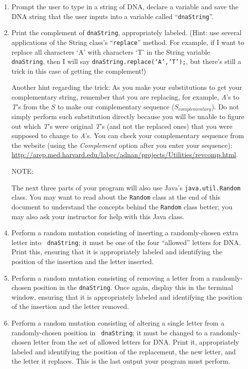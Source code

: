 \begin{enumerate}

\item Prompt the user to type in a string of DNA, declare a variable and save the DNA string that the user inputs into a
  variable called ``{\tt dnaString}''.

\item Print the complement of {\tt dnaString}, appropriately labeled.  (Hint: use several applications of the String
  class's ``{\tt replace}'' method. For example, if I want to replace all characters `A' with characters `T' in the
  String variable {\tt dnaString}, then I will say {\tt dnaString.replace(`A',`T');}, but there's still a trick in this
  case of getting the complement!)

Another hint regarding the trick: As you make your substitutions to get your complementary string, remember that you are
replacing, for example, \emph{A}'s to \emph{T}'s from the $S$ to make our complementary sequence ($S_{complementary}$).
Do not simply perform such substitution directly because you will be unable to figure out which \emph{T}'s were original
\emph{T}'s (and not the replaced ones) that you were supposed to change to \emph{A}'s. You can check your complementary
sequence from the website  (using the \emph{Complement} option after you enter your sequence): \url{http://arep.med.harvard.edu/labgc/adnan/projects/Utilities/revcomp.html}.

\item[NOTE:]

The next three parts of your program will also use Java's {\tt java.util.Random} class. You may want to read about the
{\tt Random} class at the end of this document to understand the concepts behind the {\tt Random} class better; you may
also ask your instructor for help with this Java class.

\item \begin{sloppypar} Perform a random mutation consisting of inserting a randomly-chosen extra letter into {\tt
  dnaString}; it must be one of the four ``allowed'' letters for DNA. Print this, ensuring that it is appropriately
labeled and identifying the position of the insertion and the letter inserted. \end{sloppypar}

\item Perform a random mutation consisting of removing a letter from a randomly-chosen position in the {\tt dnaString}.
  Once again, display this in the terminal window, ensuring that it is appropriately labeled and identifying the
  position of the insertion and the letter removed.

\item Perform a random mutation consisting of altering a single letter from a randomly-chosen position in {\tt
  dnaString}; it must be changed to a randomly-chosen letter from the set of allowed letters for DNA. Print it,
  appropriately labeled and identifying the position of the replacement, the new letter, and the letter it replaces.
  This is the last output your program must perform.

\end{enumerate}

